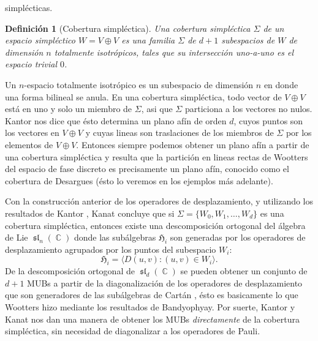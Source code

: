 \documentclass[a4paper]{report}
\DeclareMathOperator{\C}{\mathbb{C}}
\DeclareMathOperator{\Sl}{\mathfrak{sl}}
\newtheorem{definition}{Definición}
\begin{document}
  simplécticas.
  \begin{definition}[Cobertura simpléctica]
    Una cobertura simpléctica $\Sigma$ de un espacio
    simpléctico $W = V \oplus V$ es una familia $\Sigma$ de
    $d+1$ subespacios de $W$ de dimensión $n$ totalmente
    isotrópicos, tales que su intersección uno-a-uno es el
    espacio trivial $0$. 
  \end{definition}
  Un $n$-espacio totalmente isotrópico es un subespacio de
  dimensión $n$ en donde una forma bilineal se anula. En una
  cobertura simpléctica, todo vector de $V \oplus V$ está en
  uno y solo un miembro de $\Sigma$, asi que $\Sigma$
  particiona a los vectores no nulos. Kantor nos dice que
  ésto determina un plano afín de orden $d$, cuyos puntos
  son los vectores en $V \oplus V$ y cuyas lineas son
  traslaciones de los miembros de $\Sigma$ por los elementos
  de $V \oplus V$. Entonces siempre podemos obtener un plano
  afín a partir de una cobertura simpléctica y resulta que
  la partición en lineas rectas de Wootters del espacio de
  fase discreto es precisamente un plano afín, conocido como
  el cobertura de Desargues (ésto lo veremos en los ejemplos
  más adelante).

  Con la construcción anterior de los operadores de
  desplazamiento, y utilizando los resultados de Kantor
  \cite{kantor1996}, Kanat concluye que si $\Sigma = \{W_0,
  W_1, \ldots, W_d\}$ es una cobertura simpléctica, entonces
  existe una descomposición ortogonal del álgebra de Lie
  $\Sl_n(\C)$ donde las subálgebras $\mathfrak{H}_i$ son
  generadas por los operadores de desplazamiento agrupados
  por los puntos del subespacio $W_i$:
  \begin{equation}
    \mathfrak{H}_i = \langle D(u,v) : (u,v) \in W_i \rangle.
  \end{equation}
  De la descomposición ortogonal de $\Sl_d(\C)$ se pueden
  obtener un conjunto de $d+1$ MUBs a partir de la
  diagonalización de los operadores de desplazamiento que
  son generadores de las subálgebras de Cartán
  \cite{boykin2005}, ésto es basicamente lo que Wootters
  hizo mediante los resultados de Bandyophyay. Por suerte,
  Kantor y Kanat nos dan una manera de obtener los MUBs
  \textit{directamente} de la cobertura simpléctica, sin
  necesidad de diagonalizar a los operadores de Pauli.
  
\end{document}
